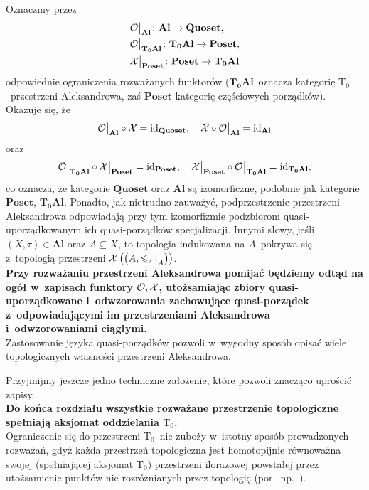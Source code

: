 Oznaczmy przez 
\begin{align*}
&\mathcal{O}\big|_{\mathbf{\mathbf{A}l}}\colon \mathbf{\mathbf{A}l}\to \mathbf{\mathbf{Q}uoset},\\
&\mathcal{O}\big|_{\mathbf{T_0\mathbf{A}l}}\colon \mathbf{T_0\mathbf{A}l}\to \mathbf{\mathbf{P}oset},\\
&\mathcal{X}\big|_{\mathbf{\mathbf{P}oset}}\colon \mathbf{\mathbf{P}oset}\to \mathbf{T_0\mathbf{A}l}
\end{align*}
odpowiednie ograniczenia rozważanych funktorów ($\mathbf{T_0\mathbf{A}l}$~oznacza kategorię $\mathrm{T_0}$~przestrzeni Aleksandrowa, zaś $\mathbf{\mathbf{P}oset}$ kategorię częściowych porządków). Okazuje się, że \[\mathcal{O}\big|_{\mathbf{\mathbf{A}l}}\circ \mathcal{X}=\operatorname{id}_{\mathbf{\mathbf{Q}uoset}},\quad \mathcal{X}\circ \mathcal{O}\big|_{\mathbf{\mathbf{A}l}}=\operatorname{id}_{\mathbf{\mathbf{A}l}}\] oraz \[\mathcal{O}\big|_{\mathbf{T_0\mathbf{A}l}}\circ \mathcal{X}\big|_{\mathbf{\mathbf{P}oset}}=\operatorname{id}_{\mathbf{\mathbf{P}oset}},\quad \mathcal{X}\big|_{\mathbf{\mathbf{P}oset}}\circ \mathcal{O}\big|_{\mathbf{T_0\mathbf{A}l}}=\operatorname{id}_{\mathbf{T_0\mathbf{A}l}},\]
co oznacza, że kategorie $\mathbf{\mathbf{Q}uoset}$ oraz $\mathbf{\mathbf{A}l}$ są izomorficzne, podobnie jak kategorie $\mathbf{\mathbf{P}oset}$, $\mathbf{T_0\mathbf{A}l}$. Ponadto, jak nietrudno zauważyć, podprzestrzenie przestrzeni Aleksandrowa odpowiadają przy tym izomorfizmie podzbiorom quasi-uporządkowanym ich quasi-porządków specjalizacji. Innymi słowy, jeśli $(X,\tau)\in\mathbf{Al}$ oraz $A\subseteq X$, to topologia indukowana na $A$~pokrywa się z~topologią przestrzeni $\mathcal{X}\left(\big(A,\leqslant_\tau\!\big|_{A}\big)\right)$.\\

\textbf{Przy rozważaniu przestrzeni Aleksandrowa pomijać będziemy odtąd na ogół w~zapisach funktory $\mathcal{O},\mathcal{X}$, utożsamiając zbiory quasi-uporządkowane i~odwzorowania zachowujące quasi-porządek z~odpowiadającymi im przestrzeniami Aleksandrowa i~odwzorowaniami ciągłymi.}\\

Zastosowanie języka quasi-porządków pozwoli w~wygodny sposób opisać wiele topologicznych własności przestrzeni Aleksandrowa. 

Przyjmijmy jeszcze jedno techniczne założenie, które pozwoli znacząco uprościć zapisy.\\

\textbf{Do końca rozdziału wszystkie rozważane przestrzenie topologiczne spełniają aksjomat oddzielania $\mathrm{T_0}$.}\\

Ograniczenie się do przestrzeni $\mathrm{T_0}$~nie zuboży w~istotny sposób prowadzonych rozważań, gdyż każda przestrzeń topologiczna jest homotopijnie równoważna swojej (spełniającej aksjomat $\mathrm{T_0}$) przestrzeni ilorazowej powstałej przez utożsamienie punktów nie rozróżnianych przez topologię (por.~np.~\cite[podrozdział I.4]{Kukiela10}).

